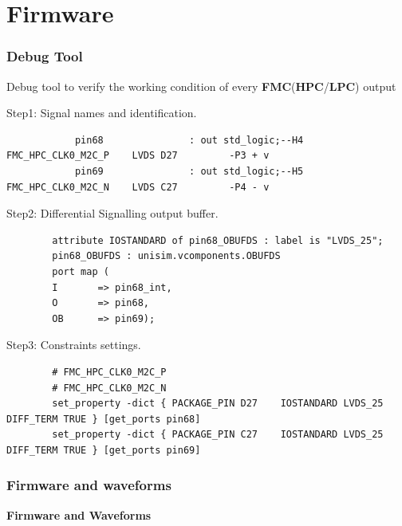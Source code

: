 \documentclass[aspectratio=169]{beamer}
\begin{document}
	
	\section{Firmware}
	
	
	
	\begin{frame}[fragile]
	\frametitle{Debug Tool}
	Debug tool to verify the working condition of every \textbf{FMC}(\textbf{HPC}/\textbf{LPC}) output
	\begin{center}
		{\small \color{blue} Step1: Signal names and identification.}
	\end{center}
	{\tiny
		\begin{verbatim}
			pin68				: out std_logic;--H4  FMC_HPC_CLK0_M2C_P    LVDS D27         -P3 + v
			pin69				: out std_logic;--H5  FMC_HPC_CLK0_M2C_N    LVDS C27         -P4 - v 
		\end{verbatim} }
	\begin{center}
		{\small \color{blue} Step2: Differential Signalling output buffer.}
	\end{center}
	{\tiny
		\begin{verbatim}
		attribute IOSTANDARD of pin68_OBUFDS : label is "LVDS_25";	
		pin68_OBUFDS : unisim.vcomponents.OBUFDS
		port map (
		I		=> pin68_int,
		O		=> pin68,
		OB		=> pin69);		
		\end{verbatim} }
	\begin{center}
		{\small \color{blue} Step3: Constraints settings.}
	\end{center}
	{\tiny
		\begin{verbatim}
		# FMC_HPC_CLK0_M2C_P
		# FMC_HPC_CLK0_M2C_N
		set_property -dict { PACKAGE_PIN D27	IOSTANDARD LVDS_25 DIFF_TERM TRUE }	[get_ports pin68]
		set_property -dict { PACKAGE_PIN C27	IOSTANDARD LVDS_25 DIFF_TERM TRUE }	[get_ports pin69]
		\end{verbatim} }
	\end{frame}

	\begin{frame}
	\frametitle{Firmware and waveforms}
	\begin{center}
		{\Huge {}\selectfont \color{blue} \textbf{Firmware and Waveforms}}
	\end{center}
	\end{frame}
\end{document}
